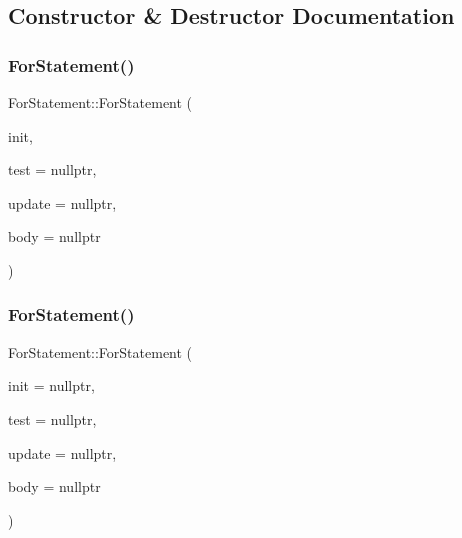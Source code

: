 \subsection{Constructor \& Destructor Documentation}
\mbox{\label{struct_for_statement_ac6f0bfa1c5a48bcf2ed048639e13cd16}} 
\subsubsection{\texorpdfstring{For\+Statement()}{ForStatement()}\hspace{0.1cm}{\footnotesize\ttfamily [1/2]}}
{\footnotesize\ttfamily For\+Statement\+::\+For\+Statement (\begin{DoxyParamCaption}\item[{\hyperlink{struct_variable_declaration_list}{Variable\+Declaration\+List} $\ast$}]{init,  }\item[{\hyperlink{struct_expression}{Expression} $\ast$}]{test = {\ttfamily nullptr},  }\item[{\hyperlink{struct_expression}{Expression} $\ast$}]{update = {\ttfamily nullptr},  }\item[{\hyperlink{struct_statement}{Statement} $\ast$}]{body = {\ttfamily nullptr} }\end{DoxyParamCaption})\hspace{0.3cm}{\ttfamily [inline]}}

\mbox{\label{struct_for_statement_a3073886e1dc3db4bd301331596da922b}} 
\subsubsection{\texorpdfstring{For\+Statement()}{ForStatement()}\hspace{0.1cm}{\footnotesize\ttfamily [2/2]}}
{\footnotesize\ttfamily For\+Statement\+::\+For\+Statement (\begin{DoxyParamCaption}\item[{\hyperlink{struct_expression}{Expression} $\ast$}]{init = {\ttfamily nullptr},  }\item[{\hyperlink{struct_expression}{Expression} $\ast$}]{test = {\ttfamily nullptr},  }\item[{\hyperlink{struct_expression}{Expression} $\ast$}]{update = {\ttfamily nullptr},  }\item[{\hyperlink{struct_statement}{Statement} $\ast$}]{body = {\ttfamily nullptr} }\end{DoxyParamCaption})\hspace{0.3cm}{\ttfamily [inline]}}



